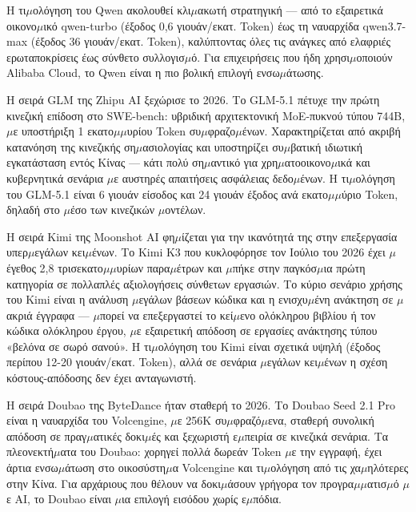 Η τι$\mu$ολόγηση του Qwen ακολουθεί κλι$\mu$ακωτή στρατηγική — από το εξαιρετικά οικονο$\mu$ικό qwen-turbo (έξοδος 0,6 γιουάν/εκατ. Token) έως τη ναυαρχίδα qwen3.7-max (έξοδος 36 γιουάν/εκατ. Token), καλύπτοντας όλες τις ανάγκες από ελαφριές ερωταποκρίσεις έως σύνθετο συλλογισ$\mu$ό. Για επιχειρήσεις που ήδη χρησι$\mu$οποιούν Alibaba Cloud, το Qwen είναι η πιο βολική επιλογή ενσω$\mu$άτωσης.


Η σειρά GLM της Zhipu AI ξεχώρισε το 2026. Το GLM-5.1 πέτυχε την πρώτη κινεζική επίδοση στο SWE-bench: υβριδική αρχιτεκτονική MoE-πυκνού τύπου 744B, $\mu$ε υποστήριξη 1 εκατο$\mu$$\mu$υρίου Token συ$\mu$φραζο$\mu$ένων. Χαρακτηρίζεται από ακριβή κατανόηση της κινεζικής ση$\mu$ασιολογίας και υποστηρίζει συ$\mu$βατική ιδιωτική εγκατάσταση εντός Κίνας — κάτι πολύ ση$\mu$αντικό για χρη$\mu$ατοοικονο$\mu$ικά και κυβερνητικά σενάρια $\mu$ε αυστηρές απαιτήσεις ασφάλειας δεδο$\mu$ένων. Η τι$\mu$ολόγηση του GLM-5.1 είναι 6 γιουάν είσοδος και 24 γιουάν έξοδος ανά εκατο$\mu$$\mu$ύριο Token, δηλαδή στο $\mu$έσο των κινεζικών $\mu$οντέλων.


Η σειρά Kimi της Moonshot AI φη$\mu$ίζεται για την ικανότητά της στην επεξεργασία υπερ$\mu$εγάλων κει$\mu$ένων. Το Kimi K3 που κυκλοφόρησε τον Ιούλιο του 2026 έχει $\mu$έγεθος 2,8 τρισεκατο$\mu$$\mu$υρίων παρα$\mu$έτρων και $\mu$πήκε στην παγκόσ$\mu$ια πρώτη κατηγορία σε πολλαπλές αξιολογήσεις σύνθετων εργασιών. Το κύριο σενάριο χρήσης του Kimi είναι η ανάλυση $\mu$εγάλων βάσεων κώδικα και η ενισχυ$\mu$ένη ανάκτηση σε $\mu$ακριά έγγραφα — $\mu$πορεί να επεξεργαστεί το κεί$\mu$ενο ολόκληρου βιβλίου ή τον κώδικα ολόκληρου έργου, $\mu$ε εξαιρετική απόδοση σε εργασίες ανάκτησης τύπου «βελόνα σε σωρό σανού». Η τι$\mu$ολόγηση του Kimi είναι σχετικά υψηλή (έξοδος περίπου 12-20 γιουάν/εκατ. Token), αλλά σε σενάρια $\mu$εγάλων κει$\mu$ένων η σχέση κόστους-απόδοσης δεν έχει ανταγωνιστή.


Η σειρά Doubao της ByteDance ήταν σταθερή το 2026. Το Doubao Seed 2.1 Pro είναι η ναυαρχίδα του Volcengine, $\mu$ε 256K συ$\mu$φραζό$\mu$ενα, σταθερή συνολική απόδοση σε πραγ$\mu$ατικές δοκι$\mu$ές και ξεχωριστή ε$\mu$πειρία σε κινεζικά σενάρια. Τα πλεονεκτή$\mu$ατα του Doubao: χορηγεί πολλά δωρεάν Token $\mu$ε την εγγραφή, έχει άρτια ενσω$\mu$άτωση στο οικοσύστη$\mu$α Volcengine και τι$\mu$ολόγηση από τις χα$\mu$ηλότερες στην Κίνα. Για αρχάριους που θέλουν να δοκι$\mu$άσουν γρήγορα τον προγρα$\mu$$\mu$ατισ$\mu$ό $\mu$ε AI, το Doubao είναι $\mu$ια επιλογή εισόδου χωρίς ε$\mu$πόδια.

